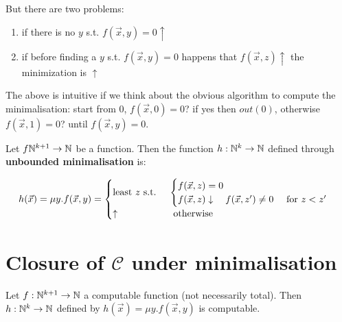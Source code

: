 But there are two problems:
\begin{enumerate}
\item if there is no $y$ s.t. $f(\vec{x},y) = 0 \uparrow$
\item if before finding a $y$ s.t. $f(\vec{x},y) = 0$ happens that $f(\vec{x},z)\uparrow$ the minimization is $\uparrow$
\end{enumerate}

The above is intuitive if we think about the obvious algorithm to compute the minimalisation: start from 0, $f(\vec{x},0) = 0$? if yes then $out(0)$, otherwise $f(\vec{x},1) = 0$? until $f(\vec{x},y) = 0$.

\begin{definition}
  Let $f\mathbb{N}^{k+1}\rightarrow\mathbb{N}$ be a function. Then the function
  $h:\mathbb{N}^k\rightarrow\mathbb{N}$ defined through \textbf{unbounded
    minimalisation} is:

  \begin{equation*}
    h(\vec{x}) = \mu y. f(\vec{x},y) = \begin{cases}
      $least $ z$ s.t. $ & \begin{cases}
        f(\vec{x},z) = 0 \\
        f(\vec{x},z)\downarrow \quad f(\vec{x},z') \not= 0 \quad $ for $ z<z'
      \end{cases} \\
      \uparrow           & $ otherwise $
    \end{cases}
  \end{equation*}
\end{definition}

\section{Closure of $\mathcal{C}$ under minimalisation}

\begin{theorem}
  Let $f:\mathbb{N}^{k+1}\rightarrow\mathbb{N}$ a computable function (not necessarily total). Then $h:\mathbb{N}^k\rightarrow\mathbb{N}$ defined by $h(\vec{x}) = \mu y. f(\vec{x},y)$ is computable.
\end{theorem}

